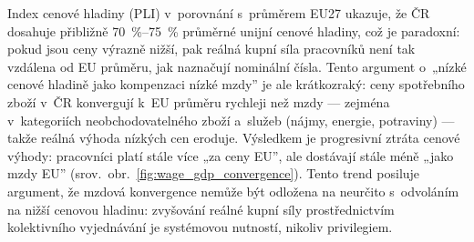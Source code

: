 Index cenové hladiny (\ac{PLI}) v~porovnání s~průměrem EU27 ukazuje, že ČR dosahuje přibližně \SIrange{70}{75}{\percent} průměrné unijní cenové hladiny, což je paradoxní: pokud jsou ceny výrazně nižší, pak reálná kupní síla pracovníků není tak vzdálena od \ac{EU} průměru, jak naznačují nominální čísla.
Tento argument o~„nízké cenové hladině jako kompenzaci nízké mzdy” je ale krátkozraký: ceny spotřebního zboží v~ČR konvergují k~\ac{EU} průměru rychleji než mzdy --- zejména v~kategoriích neobchodovatelného zboží a~služeb (nájmy, energie, potraviny) --- takže reálná výhoda nízkých cen eroduje.
Výsledkem je progresivní ztráta cenové výhody: pracovníci platí stále více „za ceny \ac{EU}”, ale dostávají stále méně „jako mzdy \ac{EU}” (srov.~obr.~\ref{fig:wage_gdp_convergence}).
Tento trend posiluje argument, že mzdová konvergence nemůže být odložena na neurčito s~odvoláním na nižší cenovou hladinu: zvyšování reálné kupní síly prostřednictvím kolektivního vyjednávání je systémovou nutností, nikoliv privilegiem.


